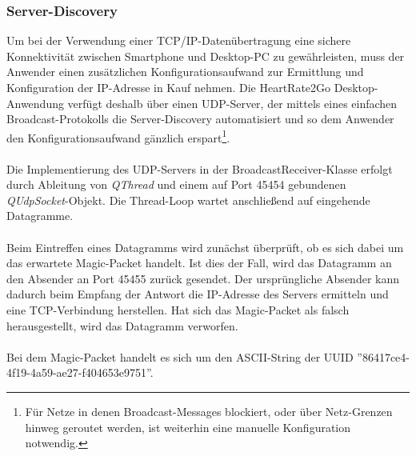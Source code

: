 \subsubsection{Server-Discovery}
Um bei der Verwendung einer TCP/IP-Datenübertragung eine sichere Konnektivität zwischen Smartphone und Desktop-PC zu gewährleisten, muss der Anwender einen zusätzlichen Konfigurationsaufwand zur Ermittlung und Konfiguration der IP-Adresse in Kauf nehmen. Die HeartRate2Go Desktop-Anwendung verfügt deshalb über einen UDP-Server, der mittels eines einfachen Broadcast-Protokolls die Server-Discovery automatisiert und so dem Anwender den Konfigurationsaufwand gänzlich erspart\footnote{Für Netze in denen Broadcast-Messages blockiert, oder über Netz-Grenzen hinweg geroutet werden, ist weiterhin eine manuelle Konfiguration notwendig.}.\\
\\
Die Implementierung des UDP-Servers in der BroadcastReceiver-Klasse erfolgt durch Ableitung von \textit{QThread} und einem auf Port 45454 gebundenen \textit{QUdpSocket}-Objekt\cite{qudpsocket}. Die Thread-Loop wartet anschließend auf eingehende Datagramme.\\
\\
Beim Eintreffen eines Datagramms wird zunächst überprüft, ob es sich dabei um das erwartete Magic-Packet handelt. Ist dies der Fall, wird das Datagramm an den Absender an Port 45455 zurück gesendet. Der ursprüngliche Absender kann dadurch beim Empfang der Antwort die IP-Adresse des Servers ermitteln und eine TCP-Verbindung herstellen. Hat sich das Magic-Packet als falsch herausgestellt, wird das Datagramm verworfen.\\
\\
Bei dem Magic-Packet handelt es sich um den ASCII-String der UUID ''86417ce4-4f19-4a59-ae27-f404653e9751''.

